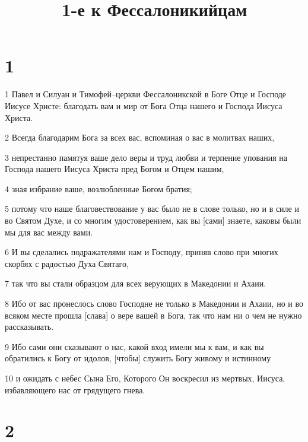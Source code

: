 

\title{1-е к Фессалоникийцам}


\chapter{1}

\par 1 Павел и Силуан и Тимофей--церкви Фессалоникской в Боге Отце и Господе Иисусе Христе: благодать вам и мир от Бога Отца нашего и Господа Иисуса Христа.
\par 2 Всегда благодарим Бога за всех вас, вспоминая о вас в молитвах наших,
\par 3 непрестанно памятуя ваше дело веры и труд любви и терпение упования на Господа нашего Иисуса Христа пред Богом и Отцем нашим,
\par 4 зная избрание ваше, возлюбленные Богом братия;
\par 5 потому что наше благовествование у вас было не в слове только, но и в силе и во Святом Духе, и со многим удостоверением, как вы [сами] знаете, каковы были мы для вас между вами.
\par 6 И вы сделались подражателями нам и Господу, приняв слово при многих скорбях с радостью Духа Святаго,
\par 7 так что вы стали образцом для всех верующих в Македонии и Ахаии.
\par 8 Ибо от вас пронеслось слово Господне не только в Македонии и Ахаии, но и во всяком месте прошла [слава] о вере вашей в Бога, так что нам ни о чем не нужно рассказывать.
\par 9 Ибо сами они сказывают о нас, какой вход имели мы к вам, и как вы обратились к Богу от идолов, [чтобы] служить Богу живому и истинному
\par 10 и ожидать с небес Сына Его, Которого Он воскресил из мертвых, Иисуса, избавляющего нас от грядущего гнева.

\chapter{2}

